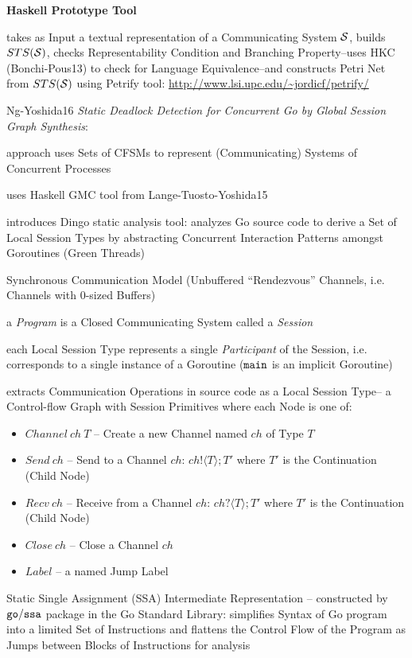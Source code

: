 \textbf{Haskell Prototype Tool}

takes as Input a textual representation of a Communicating System
$\mathcal{S}$, builds $STS(\mathcal{S})$, checks Representability
Condition and Branching Property--uses HKC (Bonchi-Pous13) to check
for Language Equivalence--and constructs Petri Net from
$STS(\mathcal{S})$ using Petrify tool:
\url{http://www.lsi.upc.edu/~jordicf/petrify/}


\endgroup


\asterism


Ng-Yoshida16 \emph{Static Deadlock Detection for Concurrent Go by
  Global Session Graph Synthesis}:

approach uses Sets of CFSMs to represent (Communicating) Systems of
Concurrent Processes

uses Haskell GMC tool from Lange-Tuosto-Yoshida15

introduces Dingo static analysis tool: analyzes Go source code to
derive a Set of Local Session Types by abstracting Concurrent
Interaction Patterns amongst Goroutines (Green Threads)

Synchronous Communication Model (Unbuffered ``Rendezvous'' Channels,
i.e. Channels with $0$-sized Buffers)

a \emph{Program} is a Closed Communicating System called a
\emph{Session}

each Local Session Type represents a single \emph{Participant} of the
Session, i.e. corresponds to a single instance of a Goroutine
($\mathtt{main}$ is an implicit Goroutine)

extracts Communication Operations in source code as a Local
Session Type-- a Control-flow Graph with Session Primitives where
each Node is one of:
\begin{itemize}
  \item $Channel\ ch\ T$ -- Create a new Channel named $ch$ of Type
    $T$
  \item $Send\ ch$ -- Send to a Channel $ch$:
    $ch!\langle{T}\rangle; T'$ where $T'$ is the Continuation
    (Child Node)
  \item $Recv\ ch$ -- Receive from a Channel $ch$:
    $ch?\langle{T}\rangle; T'$ where $T'$ is the Continuation
    (Child Node)
  \item $Close\ ch$ -- Close a Channel $ch$
  \item $Label$ -- a named Jump Label %
\end{itemize}

Static Single Assignment (SSA) Intermediate Representation --
constructed by $\mathtt{go/ssa}$ package in the Go Standard Library:
simplifies Syntax of Go program into a limited Set of Instructions and
flattens the Control Flow of the Program as Jumps between Blocks of
Instructions for analysis

